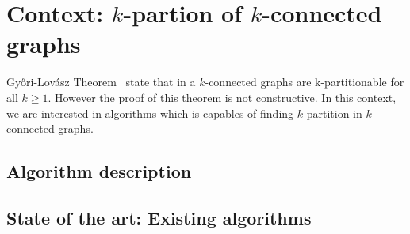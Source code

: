 \section{Context: $k$-partion of $k$-connected graphs}
Gy{\H o}ri-Lovász Theorem~\cite{GE78,LL77} state that in a $k$-connected graphs are 
k-partitionable for all $k \geq 1$. However the proof of this theorem
is not constructive. In this context, we are interested in algorithms which
is capables of finding $k$-partition in $k$-connected graphs.

\subsection{Algorithm description}


\subsection{State of the art: Existing algorithms}


